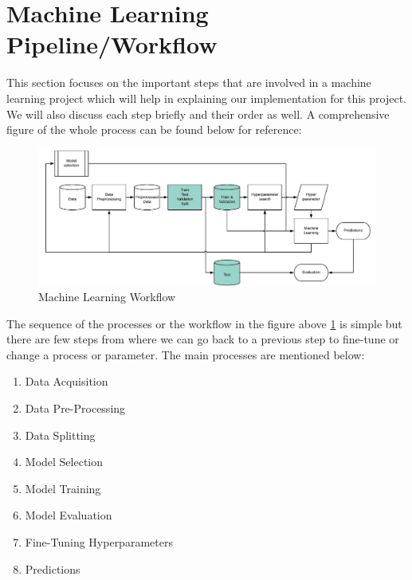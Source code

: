 \section{Machine Learning Pipeline/Workflow}
This section focuses on the important steps that are involved in a machine learning project which will help in explaining our implementation for this project. We will also discuss each step briefly and their order as well. A comprehensive figure of the whole process can be found below for reference:

\begin{figure}[H]
\centering
\includegraphics[scale=0.3]{images/Chapter2/ml-pipeline.jpg}
\caption{Machine Learning Workflow \cite{ml-pipeline}}
\label{ml-pipeline}
\end{figure}
\par
The sequence of the processes or the workflow in the figure above \ref{ml-pipeline} is simple but there are few steps from where we can go back to a previous step to fine-tune or change a process or parameter. The main processes are mentioned below:
\newline
\begin{enumerate}
  \item  Data Acquisition
  \item  Data Pre-Processing
  \item  Data Splitting
  \item  Model Selection
  \item  Model Training
  \item  Model Evaluation
  \item  Fine-Tuning Hyperparameters
  \item  Predictions
\end{enumerate}
